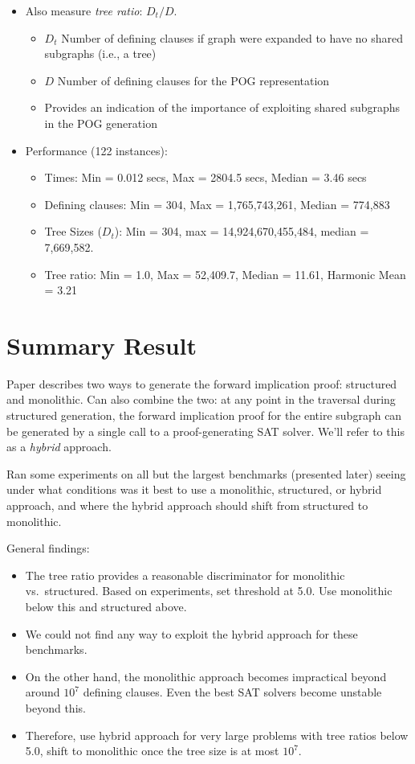 \documentclass[twoside,11pt]{article}
\begin{document}
\begin{enumerate}
\begin{itemize}
     \item Also measure \emph{tree ratio}: $D_t / D$.
       \begin{itemize}
       \item $D_t$ Number of defining clauses if graph were expanded to have no shared subgraphs (i.e., a tree)
       \item $D$ Number of defining clauses for the POG representation
       \item Provides an indication of the importance of exploiting shared subgraphs in the POG generation
       \end{itemize}

     \item Performance (122 instances):
       \begin{itemize}
       \item Times: Min = 0.012 secs, Max = 2804.5 secs, Median = 3.46 secs
       \item Defining clauses: Min = 304, Max = 1,765,743,261, Median = 774,883
       \item Tree Sizes ($D_t$): Min = 304, max = 14,924,670,455,484, median = 7,669,582.
       \item Tree ratio: Min = 1.0, Max = 52,409.7, Median = 11.61, Harmonic Mean = 3.21
       \end{itemize}
     \end{itemize}
\end{enumerate}

\section*{Summary Result}

Paper describes two ways to generate the forward implication proof:
structured and monolithic.  Can also combine the two: at any point in
the traversal during structured generation, the forward implication
proof for the entire subgraph can be generated by a single call to a proof-generating
SAT solver.  We'll refer to this as a \emph{hybrid} approach.

Ran some experiments on all but the largest benchmarks (presented
later) seeing under what conditions was it best to use a monolithic,
structured, or hybrid approach, and where the hybrid approach should
shift from structured to monolithic.

General findings:
\begin{itemize}
\item The tree ratio provides a reasonable discriminator for monolithic vs.~structured.  Based on experiments, set threshold at 5.0. Use monolithic below this and structured above.
\item We could not find any way to exploit the hybrid approach for these benchmarks.
\item On the other hand, the monolithic approach becomes impractical beyond around $10^7$ defining clauses.  Even the best SAT solvers become unstable beyond this.
\item Therefore, use hybrid approach for very large problems with tree ratios below 5.0, shift to monolithic once the tree size is at most $10^7$.
\end{itemize}
\end{document}
